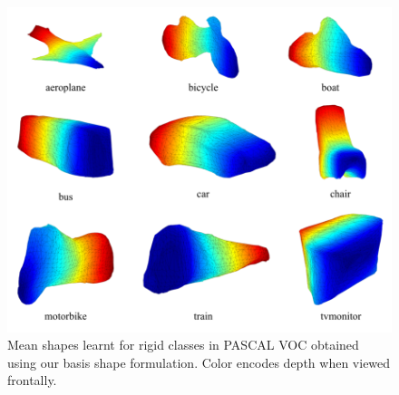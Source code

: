 \begin{figure}[htb!]
\centering
  \includegraphics[width=\textwidth]{figures/categoryshapes/meanShapesCrop.pdf}
  \caption{Mean shapes learnt for rigid classes in PASCAL VOC obtained using our basis shape formulation. Color encodes depth when viewed frontally.}
  \label{fig:meanDense}
\end{figure}
